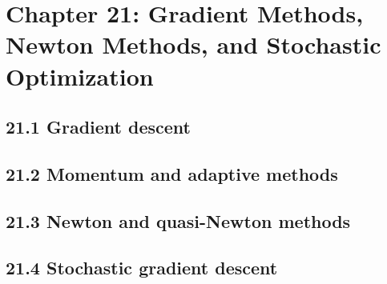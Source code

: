 \section{Chapter 21: Gradient Methods, Newton Methods, and Stochastic Optimization}

\subsection{21.1 Gradient descent}

\subsection{21.2 Momentum and adaptive methods}

\subsection{21.3 Newton and quasi-Newton methods}

\subsection{21.4 Stochastic gradient descent}

\clearpage
